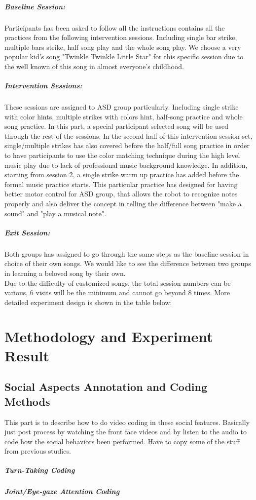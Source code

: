 \subparagraph{Baseline Session: }Participants has been asked to follow all the 
instructions contains all the practices from the following intervention sessions. 
Including single bar strike, multiple bars strike, half song play and the whole
song play. We choose a very popular kid's song "Twinkle Twinkle Little Star" 
for this specific session due to the well known of this song in almost 
everyone's childhood.\\

\subparagraph{Intervention Sessions: }These sessions are assigned to ASD group
particularly. Including single strike with color hints, multiple strikes with
colors hint, half-song practice and whole song practice. In this part, a special
participant selected song will be used through the rest of the sessions. In the second
half of this intervention session set, single/multiple strikes has also covered
before the half/full song practice in order to have participants to use the
color matching technique during the high level music play due to lack of professional
music background knowledge. In addition, starting from session 2, a single strike
warm up practice has added before the formal music practice starts. This particular
practice has designed for having better motor control for ASD group, that allows
the robot to recognize notes properly and also deliver the concept in telling the
difference between "make a sound" and "play a musical note". \\

\subparagraph{Exit Session: }Both groups has assigned to go through the same steps
as the baseline session in choice of their own songs. We would like to see the 
difference between two groups in learning a beloved song by their own.\\

Due to the difficulty of customized songs, the total session numbers can be
various, 6 visits will be the minimum and cannot go beyond 8 times. More detailed 
experiment design is shown in the table below:\\


\section{Methodology and Experiment Result}

\subsection{Social Aspects Annotation and Coding Methods}
This part is to describe how to do video coding in these social features.
Basically just post process by watching the front face videos and by listen to the
audio to code how the social behaviors been performed. Have to copy some of the stuff
from previous studies.
\subparagraph{Turn-Taking Coding}
\subparagraph{Joint/Eye-gaze Attention Coding}

